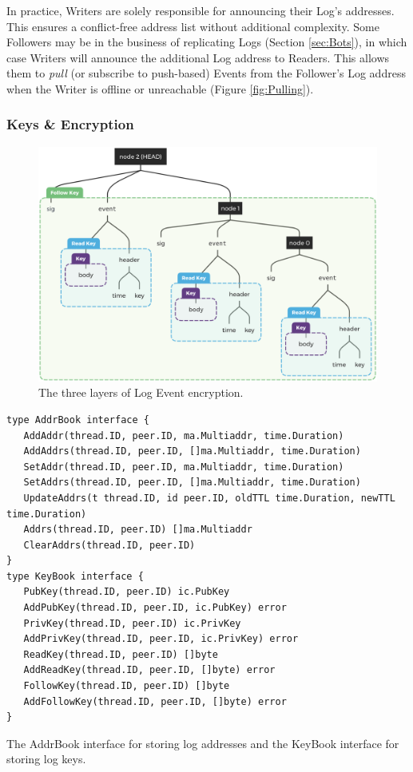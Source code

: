 \documentclass{textile}
\begin{document}
In practice, Writers are solely responsible for announcing their Log's addresses. This ensures a conflict-free address list without additional complexity. Some Followers may be in the business of replicating Logs (Section  \ref{sec:Bots}), in which case Writers will announce the additional Log address to Readers. This allows them to \emph{pull} (or subscribe to push-based) Events from the Follower's Log address when the Writer is offline or unreachable (Figure \ref{fig:Pulling}).

\subsubsection{Keys \& Encryption} \label{sec:KeysEncryption}

\begin{figure}[!t]
\centering
\begin{minipage}{0.6\textwidth}
  \includegraphics[width=\linewidth]{figures/Event_Log_With_Encryption.png}
  \caption{The three layers of Log Event encryption.}
  \label{fig:LogEncryption}
  \end{minipage}
\end{figure}

\begin{example}[!b]
\begin{lstlisting}
type AddrBook interface {
   AddAddr(thread.ID, peer.ID, ma.Multiaddr, time.Duration)
   AddAddrs(thread.ID, peer.ID, []ma.Multiaddr, time.Duration)
   SetAddr(thread.ID, peer.ID, ma.Multiaddr, time.Duration)
   SetAddrs(thread.ID, peer.ID, []ma.Multiaddr, time.Duration)
   UpdateAddrs(t thread.ID, id peer.ID, oldTTL time.Duration, newTTL time.Duration)
   Addrs(thread.ID, peer.ID) []ma.Multiaddr
   ClearAddrs(thread.ID, peer.ID)
}
type KeyBook interface {
   PubKey(thread.ID, peer.ID) ic.PubKey
   AddPubKey(thread.ID, peer.ID, ic.PubKey) error
   PrivKey(thread.ID, peer.ID) ic.PrivKey
   AddPrivKey(thread.ID, peer.ID, ic.PrivKey) error
   ReadKey(thread.ID, peer.ID) []byte
   AddReadKey(thread.ID, peer.ID, []byte) error
   FollowKey(thread.ID, peer.ID) []byte
   AddFollowKey(thread.ID, peer.ID, []byte) error
}
\end{lstlisting}
\caption{The AddrBook interface for storing log addresses and the KeyBook interface for storing log keys.}
\label{ex:KeyBook}
\end{example} 
\end{document}
